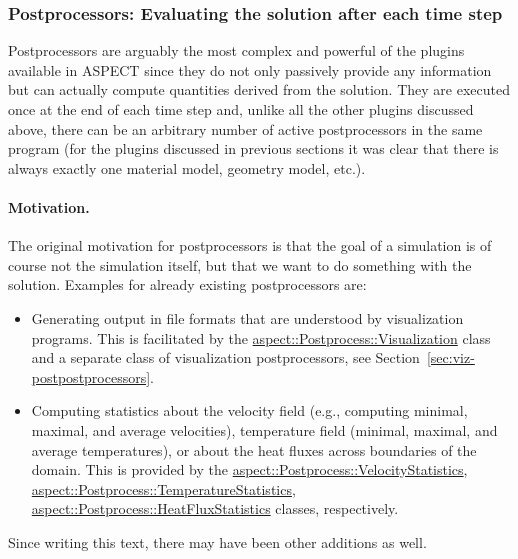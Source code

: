 \documentclass{article}
\newcommand{\aspect}{\textsc{ASPECT}}
\begin{document}
\subsubsection{Postprocessors: Evaluating the solution after each time step}
\label{sec:postprocessors}

Postprocessors are arguably the most complex and powerful of the plugins
available in \aspect{} since they do not only passively provide any
information but can actually compute quantities derived from the
solution. They are executed once at the end of each time step and,
unlike all the other plugins discussed above, there can be an arbitrary number
of active postprocessors in the same program (for the plugins discussed in
previous sections it was clear that there is always exactly one material
model, geometry model, etc.).

\paragraph{Motivation.}
The original motivation for postprocessors is that the goal of a simulation is
of course not the simulation itself, but that we want to do something with the
solution. Examples for already existing postprocessors are:
\begin{itemize}
\item Generating output in file formats that are understood by visualization
  programs. This is facilitated by the
  \href{doc/doxygen/classaspect_1_1Postprocess_1_1Visualization.html}{aspect::Postprocess::Visualization}
  class and a separate class of visualization postprocessors, see
  Section~\ref{sec:viz-postpostprocessors}.
\item Computing statistics about the velocity field (e.g., computing minimal,
  maximal, and average velocities), temperature field (minimal, maximal, and
  average temperatures), or about the heat fluxes across boundaries of the
  domain. This is provided by the
  \href{doc/doxygen/classaspect_1_1Postprocess_1_1VelocityStatistics.html}{aspect::Postprocess::VelocityStatistics},
  \href{doc/doxygen/classaspect_1_1Postprocess_1_1TemperatureStatistics.html}{aspect::Postprocess::TemperatureStatistics},
  \href{doc/doxygen/classaspect_1_1Postprocess_1_1HeatFluxStatistics.html}{aspect::Postprocess::HeatFluxStatistics}
  classes, respectively.
\end{itemize}
Since writing this text, there may have been other additions as well.
\end{document}
